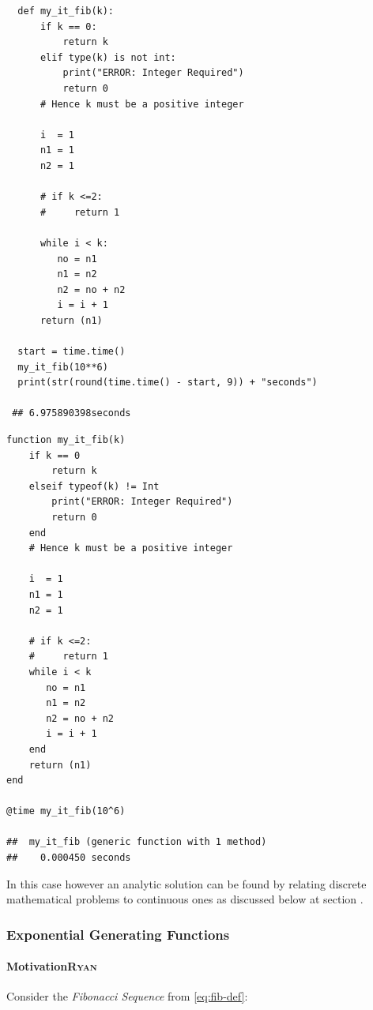 \documentclass[11pt]{article}
\begin{document}
\begin{lstlisting}
  def my_it_fib(k):
      if k == 0:
          return k
      elif type(k) is not int:
          print("ERROR: Integer Required")
          return 0
      # Hence k must be a positive integer

      i  = 1
      n1 = 1
      n2 = 1

      # if k <=2:
      #     return 1

      while i < k:
         no = n1
         n1 = n2
         n2 = no + n2
         i = i + 1
      return (n1)

  start = time.time()
  my_it_fib(10**6)
  print(str(round(time.time() - start, 9)) + "seconds")

 ## 6.975890398seconds
\end{lstlisting}

\begin{lstlisting}
function my_it_fib(k)
    if k == 0
        return k
    elseif typeof(k) != Int
        print("ERROR: Integer Required")
        return 0
    end
    # Hence k must be a positive integer

    i  = 1
    n1 = 1
    n2 = 1

    # if k <=2:
    #     return 1
    while i < k
       no = n1
       n1 = n2
       n2 = no + n2
       i = i + 1
    end
    return (n1)
end

@time my_it_fib(10^6)

##  my_it_fib (generic function with 1 method)
##    0.000450 seconds
\end{lstlisting}

In this case however an analytic solution can be found by relating discrete
mathematical problems to continuous ones as discussed below at section .
\subsubsection{Exponential Generating Functions}
\label{exp-gen-func-fib-seq}
\paragraph{Motivation\hfill{}\textsc{Ryan}}
\label{motivation}
Consider the \emph{Fibonacci Sequence} from \eqref{eq:fib-def}:
\end{document}
